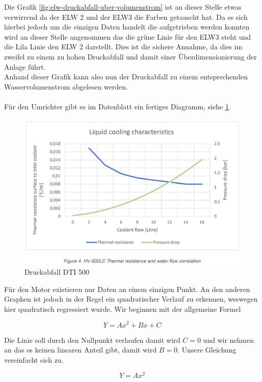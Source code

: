 Die Grafik \ref{fig:elw-druckabfall-uber-volumenstrom} ist an dieser Stelle etwas verwirrend da der ELW 2 und der ELW3 die Farben getauscht hat. Da es sich hierbei jedoch um die einzigen Daten handelt die aufgetrieben werden konnten wird an dieser Stelle angenommen das die grüne Linie für den ELW3 steht und die Lila Linie den ELW 2 darstellt. Dies ist die sichere Annahme, da dies im zweifel zu einem zu hohen Druckabfall und damit einer Überdimensionierung der Anlage führt.\\
Anhand dieser Grafik kann also nun der Druckabfall zu einem entsprechenden Wasservolumenstrom abgelesen werden.\\
\\
Für den Umrichter gibt es im Datenblatt ein fertiges Diagramm, siehe \ref{fig:cooling-characteristik}.
\begin{figure}[h]
	\centering
	\includegraphics[width=0.7\linewidth]{"bilder/Druckabfall DTI500LC"}
	\caption{Druckabfall DTI 500 \cite{manualHV500}}
	\label{fig:cooling-characteristik}
\end{figure}

Für den Motor existieren nur Daten an einem einzigen Punkt. An den anderen Graphen ist jedoch in der Regel ein quadratischer Verlauf zu erkennen, weswegen hier quadratisch regressiert wurde. Wir beginnen mit der allgemeine Formel

\begin{equation}
	Y = A x^2 + B x + C
\end{equation}

Die Linie soll durch den Nullpunkt verlaufen damit wird \ensuremath{C = 0} und wir nehmen an das es keinen linearen Anteil gibt, damit wird \ensuremath{B = 0}. Unsere Gleichung vereinfacht sich zu.

\begin{equation}
	Y = A x^2
\end{equation}

